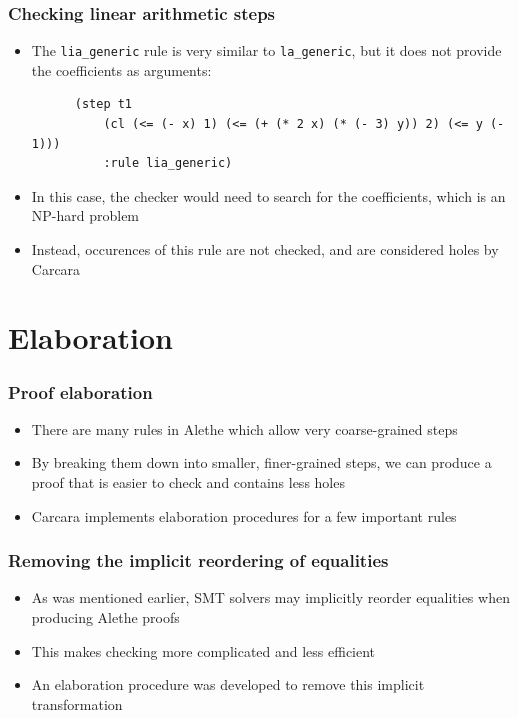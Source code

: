 \documentclass[usepdftitle=false,aspectratio=169]{beamer}
\newcommand\vitem{\vfill\item}
\begin{document}
\begin{frame}[fragile]
  \frametitle{Checking linear arithmetic steps}
  \begin{itemize}
    \item The \texttt{lia\_generic} rule is very similar to
    \texttt{la\_generic}, but it does not provide the coefficients as arguments:
    \begin{verbatim}
      (step t1
          (cl (<= (- x) 1) (<= (+ (* 2 x) (* (- 3) y)) 2) (<= y (- 1)))
          :rule lia_generic)
    \end{verbatim}
    \vitem In this case, the checker would need to search for the coefficients,
    which is an NP-hard problem
    \pause
    \vitem Instead, occurences of this rule are not checked, and are considered
    holes by Carcara
  \end{itemize}
\end{frame}

\section{Elaboration}

\begin{frame}
  \frametitle{Proof elaboration}
  \begin{itemize}
    \item There are many rules in Alethe which allow very coarse-grained steps
    \vitem By breaking them down into smaller, finer-grained steps, we can
    produce a proof that is easier to check and contains less holes
    \vitem Carcara implements elaboration procedures for a few important rules
  \end{itemize}
\end{frame}

\begin{frame}
  \frametitle{Removing the implicit reordering of equalities}
  \begin{itemize}
    \item As was mentioned earlier, SMT solvers may implicitly reorder
    equalities when producing Alethe proofs
    \vitem This makes checking more complicated and less efficient
    \vitem An elaboration procedure was developed to remove this implicit
    transformation
  \end{itemize}
\end{frame}
\end{document}
